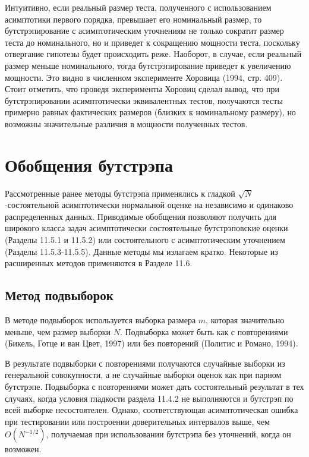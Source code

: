 Интуитивно, если реальный размер теста, полученного с использованием асимптотики первого порядка, превышает его номинальный размер, то бутстрэпирование с асимптотическим уточнениям не только  сократит размер теста до номинального, но и приведет к сокращению мощности теста, поскольку отвергание гипотезы будет  происходить реже. Наоборот, в случае, если реальный размер меньше номинального, тогда бутстрэпирование приведет к увеличению мощности. Это видно в численном эксперименте Хоровица (1994, стр. 409). Стоит отметить, что проведя эксперименты Хоровиц сделал вывод, что при  бутстрэпировании асимптотически эквивалентных тестов, получаются тесты примерно равных фактических размеров  (близких к номинальному размеру), но возможны значительные различия в мощности полученных тестов. 


\section{Обобщения бутстрэпа}

Рассмотренные ранее методы бутстрэпа применялись к гладкой $\sqrt{N}$-состоятельной асимптотически нормальной оценке на независимо и одинаково распределенных данных. Приводимые обобщения позволяют получить для широкого класса задач асимптотически состоятельные бутстрэповские оценки (Разделы 11.5.1 и 11.5.2) или состоятельного с асимптотическим уточнением (Разделы 11.5.3-11.5.5). Данные методы мы излагаем кратко. Некоторые из расширенных методов применяются в Разделе 11.6.

\subsection{Метод подвыборок}

В методе подвыборок используется выборка размера $m$, которая значительно меньше, чем размер выборки $N$. Подвыборка может быть как с повторениями (Бикель, Готце и ван Цвет, 1997) или без повторений (Политис и Романо, 1994).

В результате подвыборки с повторениями получаются случайные выборки из  генеральной совокупности, а не случайные выборки оценок как  при парном бутстрэпе. Подвыборка с повторениями может дать состоятельный результат в тех случаях, когда условия гладкости раздела 11.4.2 не выполняются и  бутстрэп по всей выборке несостоятелен. Однако, соответствующая асимптотическая ошибка при тестировании или построении  доверительных интервалов выше, чем $O(N^{-1/2})$, получаемая при использовании бутстрэпа без уточнений, когда он возможен.

